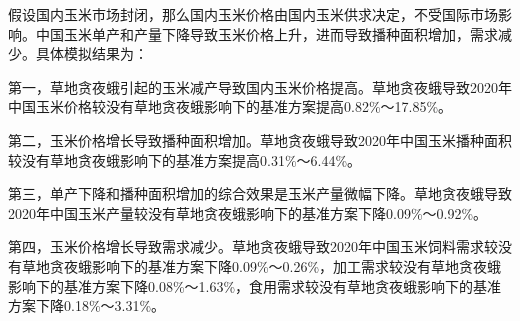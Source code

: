 \documentclass{progbookcn}
\begin{document}
假设国内玉米市场封闭，那么国内玉米价格由国内玉米供求决定，不受国际市场影响。中国玉米单产和产量下降导致玉米价格上升，进而导致播种面积增加，需求减少。具体模拟结果为：

第一，草地贪夜蛾引起的玉米减产导致国内玉米价格提高。草地贪夜蛾导致2020年中国玉米价格较没有草地贪夜蛾影响下的基准方案提高0.82\%～17.85\%。

第二，玉米价格增长导致播种面积增加。草地贪夜蛾导致2020年中国玉米播种面积较没有草地贪夜蛾影响下的基准方案提高0.31\%～6.44\%。

第三，单产下降和播种面积增加的综合效果是玉米产量微幅下降。草地贪夜蛾导致2020年中国玉米产量较没有草地贪夜蛾影响下的基准方案下降0.09\%～0.92\%。

第四，玉米价格增长导致需求减少。草地贪夜蛾导致2020年中国玉米饲料需求较没有草地贪夜蛾影响下的基准方案下降0.09\%～0.26\%，加工需求较没有草地贪夜蛾影响下的基准方案下降0.08\%～1.63\%，食用需求较没有草地贪夜蛾影响下的基准方案下降0.18\%～3.31\%。

\begin{table}[]
\centering
{}
\end{table}
\end{document}
